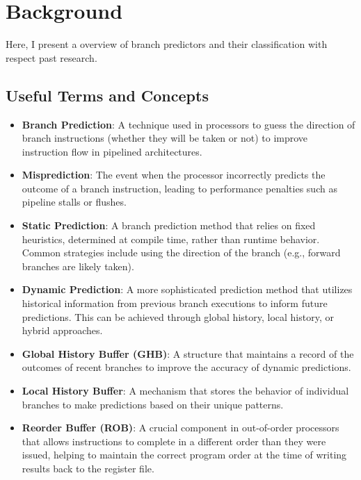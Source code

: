 \documentclass[10pt,journal,compsoc]{IEEEtran}
\begin{document}
\section{Background}\label{background}
Here, I present a overview of branch predictors and their classification with respect past research.
\subsection{Useful Terms and Concepts}
\begin{itemize}
    \item \textbf{Branch Prediction}: A technique used in processors to guess the direction of branch instructions (whether they will be taken or not) to improve instruction flow in pipelined architectures.
    
    \item \textbf{Misprediction}: The event when the processor incorrectly predicts the outcome of a branch instruction, leading to performance penalties such as pipeline stalls or flushes.
    
    \item \textbf{Static Prediction}: A branch prediction method that relies on fixed heuristics, determined at compile time, rather than runtime behavior. Common strategies include using the direction of the branch (e.g., forward branches are likely taken).
    
    \item \textbf{Dynamic Prediction}: A more sophisticated prediction method that utilizes historical information from previous branch executions to inform future predictions. This can be achieved through global history, local history, or hybrid approaches.
    
    \item \textbf{Global History Buffer (GHB)}: A structure that maintains a record of the outcomes of recent branches to improve the accuracy of dynamic predictions.
    
    \item \textbf{Local History Buffer}: A mechanism that stores the behavior of individual branches to make predictions based on their unique patterns.
        
    \item \textbf{Reorder Buffer (ROB)}: A crucial component in out-of-order processors that allows instructions to complete in a different order than they were issued, helping to maintain the correct program order at the time of writing results back to the register file.
    

\end{itemize}
\end{document}
